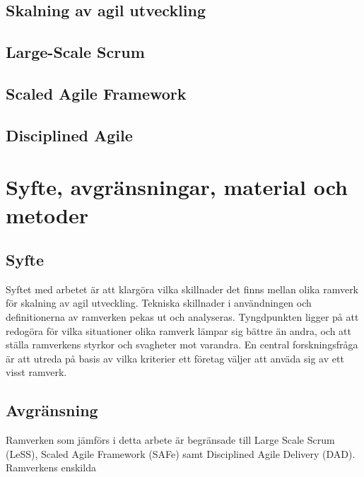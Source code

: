\subsection{Skalning av agil utveckling}



\subsection{Large-Scale Scrum}


\subsection{Scaled Agile Framework}


\subsection{Disciplined Agile}


	
\newpage

\section{Syfte, avgränsningar, material och metoder}


\subsection{Syfte}

Syftet med arbetet är att klargöra vilka skillnader det finns mellan olika ramverk för skalning av agil utveckling. Tekniska skillnader i användningen och definitionerna av ramverken pekas ut och analyseras.
Tyngdpunkten ligger på att redogöra för vilka situationer olika ramverk lämpar sig bättre än andra, och att ställa ramverkens styrkor och svagheter mot varandra. \newline
En central forskningsfråga är att utreda på basis av vilka kriterier ett företag väljer att anväda sig av ett visst ramverk.




\subsection{Avgränsning}

Ramverken som jämförs i detta arbete är begränsade till Large Scale Scrum (LeSS), Scaled Agile Framework (SAFe) samt Disciplined Agile Delivery (DAD).
Ramverkens enskilda 




